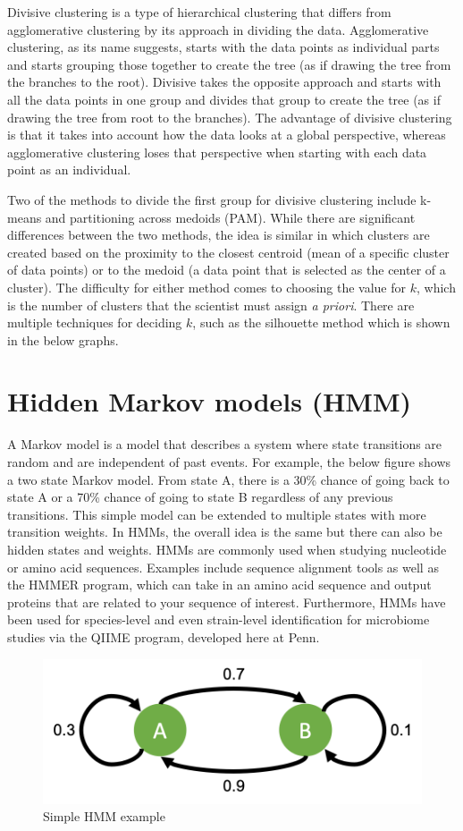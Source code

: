 \documentclass[12pt,openany]{book}
\begin{document}
Divisive clustering is a type of hierarchical clustering that differs
from agglomerative clustering by its approach in dividing the data.
Agglomerative clustering, as its name suggests, starts with the data
points as individual parts and starts grouping those together to create
the tree (as if drawing the tree from the branches to the root).
Divisive takes the opposite approach and starts with all the data points
in one group and divides that group to create the tree (as if drawing
the tree from root to the branches). The advantage of divisive
clustering is that it takes into account how the data looks at a global
perspective, whereas agglomerative clustering loses that perspective
when starting with each data point as an individual.

Two of the methods to divide the first group for divisive clustering
include k-means and partitioning across medoids (PAM). While there are
significant differences between the two methods, the idea is similar in
which clusters are created based on the proximity to the closest
centroid (mean of a specific cluster of data points) or to the medoid (a
data point that is selected as the center of a cluster). The difficulty
for either method comes to choosing the value for \(k\), which is the
number of clusters that the scientist must assign \emph{a priori}. There
are multiple techniques for deciding \(k\), such as the silhouette
method which is shown in the below graphs.

\section{Hidden Markov models (HMM)}\label{hidden-markov-models-hmm}

A Markov model is a model that describes a system where state
transitions are random and are independent of past events. For example,
the below figure shows a two state Markov model. From state A, there is
a 30\% chance of going back to state A or a 70\% chance of going to
state B regardless of any previous transitions. This simple model can be
extended to multiple states with more transition weights. In HMMs, the
overall idea is the same but there can also be hidden states and
weights. HMMs are commonly used when studying nucleotide or amino acid
sequences. Examples include sequence alignment tools as well as the
HMMER program, which can take in an amino acid sequence and output
proteins that are related to your sequence of interest. Furthermore,
HMMs have been used for species-level and even strain-level
identification for microbiome studies via the QIIME program, developed
here at Penn.

\begin{figure}

{\centering \includegraphics[width=0.35\linewidth]{fig/mm_fig} 

}

\caption{Simple HMM example}\label{fig:unnamed-chunk-5}
\end{figure}


\end{document}
